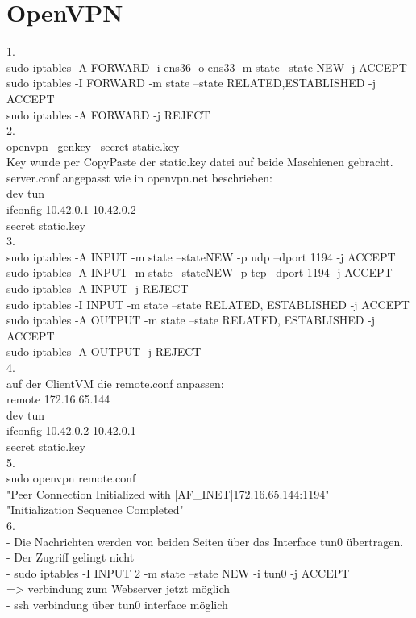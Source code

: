 \documentclass[12pt]{article}
\theoremstyle{plain}
\begin{document}
\section{OpenVPN}
1.\\
sudo iptables -A FORWARD -i ens36 -o ens33 -m state --state NEW -j ACCEPT\\
sudo iptables -I FORWARD -m state --state RELATED,ESTABLISHED -j ACCEPT\\
sudo iptables -A FORWARD -j REJECT\\
2.\\
openvpn --genkey --secret static.key\\
Key wurde per CopyPaste der static.key datei auf beide Maschienen gebracht.\\
server.conf angepasst wie in openvpn.net beschrieben:\\
dev tun\\
ifconfig 10.42.0.1 10.42.0.2\\
secret static.key\\
3.\\
sudo iptables -A INPUT -m state --stateNEW -p udp --dport 1194 -j ACCEPT\\
sudo iptables -A INPUT -m state --stateNEW -p tcp --dport 1194 -j ACCEPT\\
sudo iptables -A INPUT -j REJECT\\
sudo iptables -I INPUT -m state --state RELATED, ESTABLISHED -j ACCEPT\\
sudo iptables -A OUTPUT -m state --state RELATED, ESTABLISHED -j ACCEPT\\
sudo iptables -A OUTPUT -j REJECT\\
4.\\
auf der ClientVM die remote.conf anpassen:\\
remote 172.16.65.144\\
dev tun\\
ifconfig 10.42.0.2 10.42.0.1\\
secret static.key\\
5.\\
sudo openvpn remote.conf\\
"Peer Connection Initialized with [AF\_INET]172.16.65.144:1194"\\
"Initialization Sequence Completed"\\
6.\\
- Die Nachrichten werden von beiden Seiten über das Interface tun0 übertragen.\\
- Der Zugriff gelingt nicht\\
- sudo iptables -I INPUT 2 -m state --state NEW -i tun0 -j ACCEPT\\
=> verbindung zum Webserver jetzt möglich\\
- ssh verbindung über tun0 interface möglich\\
\end{document}
